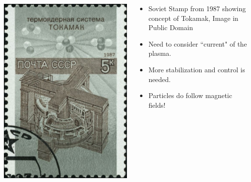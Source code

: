\documentclass{beamer}
\begin{document}
\begin{frame}
\begin{columns}
\begin{column}{0.5\linewidth}
\includegraphics[width=\linewidth]{tokamak_stamp.jpg}
\end{column}
\begin{column}{0.5\linewidth}
\begin{itemize}
\item {\color{gray} Soviet Stamp from 1987 showing concept of Tokamak, Image in Public Domain}

\item <1-> Need to consider ``current" of the plasma.

\item <2-> More stabilization and control is needed.

\item <3-> Particles do follow magnetic fields!
\end{itemize}
\end{column}
\end{columns}
\end{frame}
\end{document}
